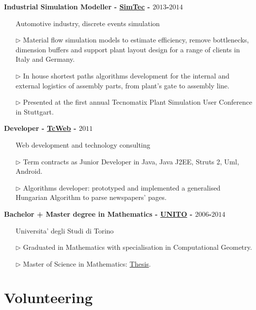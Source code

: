 \documentclass[margin,line]{resume}
\begin{document}
\begin{resume}
{\bf Industrial Simulation Modeller - \href{https://www.simtec-group.eu/it/}{SimTec} - $2013$-$2014$}
\vspace{0.1cm}
\begin{itemize}
    \item[] \hspace{-1.0cm} Automotive industry, discrete events simulation
    \item[$\triangleright$] Material flow simulation models to estimate efficiency, remove bottlenecks, dimension buffers and support plant layout design for a range of clients in Italy and Germany.
    \item[$\triangleright$] In house shortest paths algorithms development for the internal and external logistics of assembly parts, from plant's gate to assembly line. 
    \item[$\triangleright$] Presented at the first annual Tecnomatix Plant Simulation User Conference in Stuttgart.
\end{itemize}


{\bf Developer - \href{https://www.tc-web.it}{TcWeb} - $2011$}
\vspace{0.1cm}
\begin{itemize}
    \item[] \hspace{-1.0cm} Web development and technology consulting
    \item[$\triangleright$] Term contracts as Junior Developer in Java, Java J2EE,
    Struts 2, Uml, Android. 
    \item[$\triangleright$] Algorithms developer: prototyped and implemented a generalised Hungarian Algorithm to parse newspapers' pages.
\end{itemize}


{\bf Bachelor + Master degree in Mathematics - \href{https://en.unito.it/}{UNITO} - $2006$-$2014$}
\vspace{0.1cm}
\begin{itemize}
    \item[] \hspace{-1.0cm} Universita' degli Studi di Torino
    \item[$\triangleright$] Graduated in Mathematics with specialisation in Computational Geometry.
    \item[$\triangleright$] Master of Science in Mathematics: \href{https://www.matematicamente.it/tesi/Ferraris-Winograd.pdf}{Thesis}.
\end{itemize}


\section{\mysidestyle Volunteering}


\end{resume}
\end{document}
